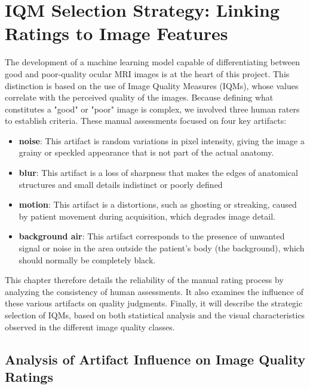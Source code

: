 \chapter{IQM Selection Strategy: Linking Ratings to Image Features}
\label{chap:iqm_selection_strategy}

The development of a machine learning model capable of differentiating between good and poor-quality ocular MRI images is at the heart of this project. This distinction is based on the use of Image Quality Measures (IQMs), whose values correlate with the perceived quality of the images. Because defining what constitutes a "good" or "poor" image is complex, we involved three human raters to establish criteria. These manual assessments focused on four key artifacts: 

\begin{itemize}
    \item \textbf{noise}: This artifact is random variations in pixel intensity, giving the image a grainy or speckled appearance that is not part of the actual anatomy.
    \item \textbf{blur}: This artifact is a loss of sharpness that makes the edges of anatomical structures and small details indistinct or poorly defined
    \item \textbf{motion}: This artifact is a distortions, such as ghosting or streaking, caused by patient movement during acquisition, which degrades image detail.
    \item \textbf{background air}: This artifact corresponds to the presence of unwanted signal or noise in the area outside the patient's body (the background), which should normally be completely black.
\end{itemize}

This chapter therefore details the reliability of the manual rating process by analyzing the consistency of human assessments. It also examines the influence of these various artifacts on quality judgments. Finally, it will describe the strategic selection of IQMs, based on both statistical analysis and the visual characteristics observed in the different image quality classes.


\section{Analysis of Artifact Influence on Image Quality Ratings}
\label{sec:analysis_artifact_influence}

